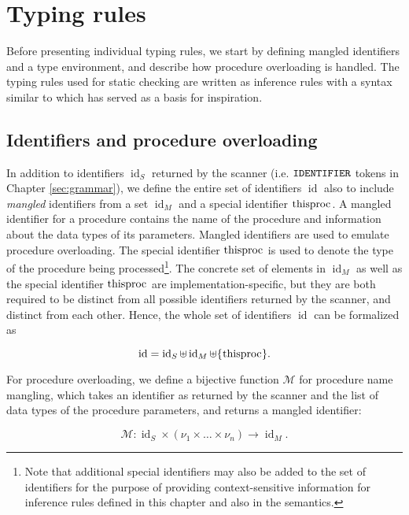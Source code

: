\documentclass[a4paper, 10pt, draft]{report}
\newcommand{\mycode}[1]{\ensuremath{\mbox{\lstinline{#1}}}}
\newcommand{\bnfM}[1]{\ensuremath{\mbox{\textcolor{black}{\texttt{\uppercase{#1}}}}}} %
\begin{document}
\section{Typing rules}\label{sec:checking:typing}

Before presenting individual typing rules, we start by defining mangled
identifiers and a type environment, and describe how procedure overloading is
handled. The typing rules used for static checking are written as inference
rules with a syntax similar to \cite{VSI96} which has served as a basis for
inspiration.

\subsection{Identifiers and procedure overloading}\label{sec:checking:typing:identifiers}
In addition to identifiers $\operatorname{id}_S$ returned by the scanner (i.e.
  \bnfM{IDENTIFIER} tokens in Chapter \ref{sec:grammar}), we define the
entire set of identifiers $\operatorname{id}$ also to include \textit{mangled}
identifiers from a set $\operatorname{id}_M$ and a special identifier
\mycode{thisproc}. A mangled identifier for a procedure contains the name of
the procedure and information about the data types of its parameters. Mangled
identifiers are used to emulate procedure overloading. The special identifier
\mycode{thisproc} is used to denote the type of the procedure being
processed\footnote{Note that additional special identifiers may also be added
to the set of identifiers for the purpose of providing context-sensitive
information for inference rules defined in this chapter and also in the
semantics.}. The concrete set of elements in $\operatorname{id}_M$ as well
as the special identifier \mycode{thisproc} are implementation-specific,
but they are both required to be distinct from all possible identifiers
returned by the scanner, and distinct from each other. Hence, the whole set
of identifiers $\operatorname{id}$ can be formalized as

\[
\operatorname{id} = \operatorname{id}_S \uplus \operatorname{id}_M \uplus \{\mycode{thisproc}\}.
\]

For procedure overloading, we define a bijective function $\mathcal{M}$ for
procedure name mangling, which takes an identifier as returned by the scanner
and the list of data types of the procedure parameters, and returns a mangled
identifier:

\[
\mathcal{M} : \operatorname{id}_S \times \left(\nu_1 \times \ldots \times \nu_n \right) \rightarrow \operatorname{id}_M.
\]
\end{document}

